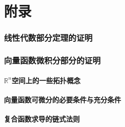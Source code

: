 \documentclass[zihao=-4,linespread=1.5,heading=true,a4paper,twoside]{ctexart}
\begin{document}

\newpage\part{附录}
\section{线性代数部分定理的证明}\label{sec:VI.1}


\section{向量函数微积分部分的证明}\label{sec:VI.2}
\subsection{$\mathbb{R}^n$空间上的一些拓扑概念}


\subsection{向量函数可微分的必要条件与充分条件}


\subsection{复合函数求导的链式法则}

\end{document}
